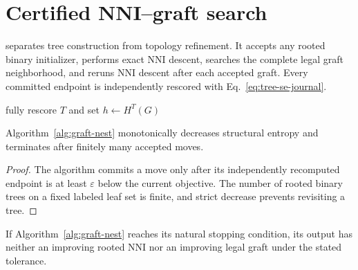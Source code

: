 \section{Certified NNI--graft search}\label{sec:algorithm}

\GNEST separates tree construction from topology refinement. It accepts any
rooted binary initializer, performs exact NNI descent, searches the complete
legal graft neighborhood, and reruns NNI descent after each accepted graft.
Every committed endpoint is independently rescored with
Eq.~\eqref{eq:tree-se-journal}.

\begin{algorithm}[t]
\caption{Exact certified NNI--graft refinement}\label{alg:graft-nest}
fully rescore $T$ and set $h\leftarrow H^T(G)$\;
\end{algorithm}

\begin{proposition}\label{prop:termination}
Algorithm~\ref{alg:graft-nest} monotonically decreases structural entropy and
terminates after finitely many accepted moves.
\end{proposition}

\begin{proof}
The algorithm commits a move only after its independently recomputed endpoint
is at least $\varepsilon$ below the current objective. The number of rooted
binary trees on a fixed labeled leaf set is finite, and strict decrease
prevents revisiting a tree.
\end{proof}

\begin{proposition}\label{prop:union-cert}
If Algorithm~\ref{alg:graft-nest} reaches its natural stopping condition, its
output has neither an improving rooted NNI nor an improving legal graft under
the stated tolerance.
\end{proposition}

